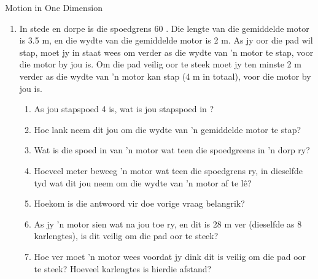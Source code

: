 \begin{eocexercises}{Motion in One Dimension}
\begin{enumerate}[noitemsep, label=\textbf{\arabic*}. ]
    \begin{enumerate}
    \item{Gebruik die grafiek om die volgende te vind:}
        \begin{enumerate}
            \item{Die spoed 5 s na die begin}
            \item{Die afstand afgel\^e in deel A}
            \item{Die versnelling in deel C}
        \end{enumerate} 
    \item Op tyd t$_1$ sny die snelheid teen tyd grafiek die tyd as. Gebruik die regte vergelyking van beweging om die waarde van tyd t$_1$ (in s) te vind.
    \item Skets die verplasing teen tyd grafiek vir die beweging van die bal vir hierdie 12 sekondes. (Jy hoef nie die regte waardes te bereken vir elke tydinterval nie, maar gee aandag aan die algemene vorm van die grafiek vir elke interval)
    \end{enumerate}


    \item In stede en dorpe is die spoedgrens 60 \kph. Die lengte van die gemiddelde motor is 3.5 m, en die wydte van die gemiddelde motor is 2 m. As jy oor die pad wil stap, moet jy in staat wees om verder as die wydte van 'n motor te stap, voor die motor by jou is. Om die pad veilig oor te steek moet jy ten minste 2 m verder as die wydte van 'n motor kan stap (4 m in totaal), voor die motor by jou is. 
    \begin{enumerate}
        \item As jou stapspoed 4 \kph is, wat is jou stapspoed in \ms?
        \item Hoe lank neem dit jou om die wydte van 'n gemiddelde motor te stap?
        \item Wat is die spoed in \ms van 'n motor wat teen die spoedgreens in 'n dorp ry?
        \item Hoeveel meter beweeg 'n motor wat teen die spoedgrens ry, in dieselfde tyd wat dit jou neem om die wydte van 'n motor af te l\^e?
        \item Hoekom is die antwoord vir doe vorige vraag belangrik?
        \item As jy 'n motor sien wat na jou toe ry, en dit is 28 m ver (dieselfde as 8 karlengtes), is dit veilig om die pad oor te steek?
        \item Hoe ver moet 'n motor wees voordat jy dink dit is veilig om die pad oor te steek? Hoeveel karlengtes is hierdie afstand?
    \end{enumerate}


\end{enumerate}
\end{eocexercises}
